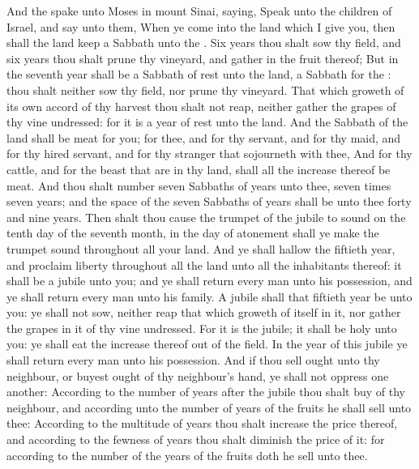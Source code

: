 \begin{biblechapter} %
 And the \LORD spake unto Moses in mount Sinai, saying,
\verse Speak unto the children of Israel, and say unto them, When ye come into the land which I give you, then shall the land keep a Sabbath unto the \LORD.
\verse Six years thou shalt sow thy field, and six years thou shalt prune thy vineyard, and gather in the fruit thereof;
\verse But in the seventh year shall be a Sabbath of rest unto the land, a Sabbath for the \LORD: thou shalt neither sow thy field, nor prune thy vineyard.
\verse That which groweth of its own accord of thy harvest thou shalt not reap, neither gather the grapes of thy vine undressed: for it is a year of rest unto the land.
\verse And the Sabbath of the land shall be meat for you; for thee, and for thy servant, and for thy maid, and for thy hired servant, and for thy stranger that sojourneth with thee,
\verse And for thy cattle, and for the beast that are in thy land, shall all the increase thereof be meat.
\flushcolsend\columnbreak %
 And thou shalt number seven Sabbaths of years unto thee, seven times seven years; and the space of the seven Sabbaths of years shall be unto thee forty and nine years.
\verse Then shalt thou cause the trumpet of the jubile to sound on the tenth day of the seventh month, in the day of atonement shall ye make the trumpet sound throughout all your land.
\verse And ye shall hallow the fiftieth year, and proclaim liberty throughout all the land unto all the inhabitants thereof: it shall be a jubile unto you; and ye shall return every man unto his possession, and ye shall return every man unto his family.
\verse A jubile shall that fiftieth year be unto you: ye shall not sow, neither reap that which groweth of itself in it, nor gather the grapes in it of thy vine undressed.
\verse For it is the jubile; it shall be holy unto you: ye shall eat the increase thereof out of the field.
\verse In the year of this jubile ye shall return every man unto his possession.
\verse And if thou sell ought unto thy neighbour, or buyest ought of thy neighbour's hand, ye shall not oppress one another:
\verse According to the number of years after the jubile thou shalt buy of thy neighbour, and according unto the number of years of the fruits he shall sell unto thee:
\verse According to the multitude of years thou shalt increase the price thereof, and according to the fewness of years thou shalt diminish the price of it: for according to the number of the years of the fruits doth he sell unto thee.

\end{biblechapter}
